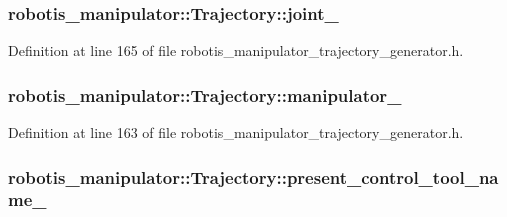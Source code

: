 \subsubsection[{\texorpdfstring{joint\+\_\+}{joint_}}]{ robotis\+\_\+manipulator\+::\+Trajectory\+::joint\+\_\+\hspace{0.3cm}{\ttfamily [private]}}\hypertarget{classrobotis__manipulator_1_1_trajectory_a3d59b0625d5d7033d42fb4b5ee64ba1b}{}\label{classrobotis__manipulator_1_1_trajectory_a3d59b0625d5d7033d42fb4b5ee64ba1b}


Definition at line 165 of file robotis\+\_\+manipulator\+\_\+trajectory\+\_\+generator.\+h.

\subsubsection[{\texorpdfstring{manipulator\+\_\+}{manipulator_}}]{ robotis\+\_\+manipulator\+::\+Trajectory\+::manipulator\+\_\+\hspace{0.3cm}{\ttfamily [private]}}\hypertarget{classrobotis__manipulator_1_1_trajectory_acd9fd9ae6cc065a10d9d438cda1081de}{}\label{classrobotis__manipulator_1_1_trajectory_acd9fd9ae6cc065a10d9d438cda1081de}


Definition at line 163 of file robotis\+\_\+manipulator\+\_\+trajectory\+\_\+generator.\+h.

\subsubsection[{\texorpdfstring{present\+\_\+control\+\_\+tool\+\_\+name\+\_\+}{present_control_tool_name_}}]{ robotis\+\_\+manipulator\+::\+Trajectory\+::present\+\_\+control\+\_\+tool\+\_\+name\+\_\+\hspace{0.3cm}{\ttfamily [private]}}\hypertarget{classrobotis__manipulator_1_1_trajectory_a497b1c21424ec3a0476cf4c96a951223}{}\label{classrobotis__manipulator_1_1_trajectory_a497b1c21424ec3a0476cf4c96a951223}



